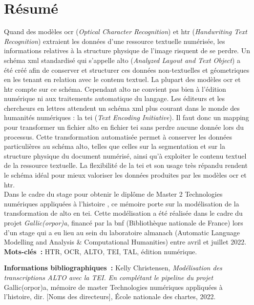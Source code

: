 \documentclass[a4paper,12pt,twoside]{book}
\begin{document}
	\frontmatter
	\chapter{Résumé}
	\medskip

Quand des modèles \acrshort{ocr} (\textit{Optical Character Recognition}) et \acrshort{htr} (\textit{Handwriting Text Recognition}) extraient les données d'une ressource textuelle numérisée, les informations relatives à la structure physique de l'image risquent de se perdre. Un schéma \acrshort{xml} standardisé qui s'appelle \acrshort{alto} (\textit{Analyzed Layout and Text Object}) a été créé afin de conserver et structurer ces données non-textuelles et géometriques en les tenant en relation avec le contenu textuel. La plupart des modèles \acrshort{ocr} et \acrshort{htr} compte sur ce schéma. Cependant \acrshort{alto} ne convient pas bien à l'édition numérique ni aux traitements automatique du langage. Les éditeurs et les chercheurs en lettres attendent un schéma \acrshort{xml} plus courant dans le monde des humanités numériques : la \acrshort{tei} (\textit{Text Encoding Initiative}). Il faut donc un mapping pour transformer un fichier \acrshort{alto} en fichier \acrshort{tei} sans perdre aucune donnée lors du processus. Cette transformation automatisée permet à conserver les données particulières au schéma \acrshort{alto}, telles que celles sur la segmentation et sur la structure physique du document numérisé, ainsi qu'à exploiter le contenu textuel de la ressource textuelle. La flexibilité de la \acrshort{tei} et son usage très répandu rendent le schéma idéal pour mieux valoriser les données produites par les modèles \acrshort{ocr} et \acrshort{htr}.\\

Dans le cadre du stage pour obtenir le diplôme de Master 2 \og Technologies numériques appliquées à l'histoire \fg{}, ce mémoire porte sur la modélisation de la transformation de \acrshort{alto} en \acrshort{tei}. Cette modélisation a été réalisée dans le cadre du projet \textit{Gallic(orpor)a}, financé par la \acrshort{bnf} (Bibliothèque nationale de France) lors d'un stage qui a eu lieu au sein du laboratoire \acrshort{almanach} (Automatic Language Modelling and Analysis \& Computational Humanities) entre avril et juillet 2022.\\
	
	\textbf{Mots-clés~:} HTR, OCR, ALTO, TEI, TAL, édition numérique.
	
	\textbf{Informations bibliographiques~:} Kelly Christensen, \textit{Modélisation des transcriptions ALTO avec la TEI. En complétant le pipeline du projet} Gallic(orpor)a, mémoire de master \og{}Technologies numériques appliquées à l'histoire\fg{}, dir. [Noms des directeurs], École nationale des chartes, 2022.
	
\end{document}
